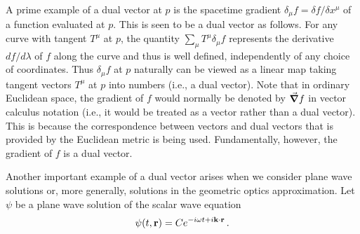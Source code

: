 A prime example of a dual vector at $p$ is the spacetime gradient $\delta_\mu f = \delta f / \delta x^\mu$ of a function evaluated at $p$. This is seen to be a dual vector as follows. For any curve with tangent $T^\mu$ at $p$, the quantity $\sum_\mu T^\mu \delta_\mu f$ represents the derivative $df / d \lambda$ of $f$ along the curve and thus is well defined, independently of any choice of coordinates. Thus $\delta_\mu f$ at $p$ naturally can be viewed as a linear map taking tangent vectors $T^\mu$ at $p$ into numbers (i.e., a dual vector). Note that in ordinary Euclidean space, the gradient of $f$ would normally be denoted by $\grad f$ in vector calculus notation (i.e., it would be treated as a vector rather than a dual vector). This is because the correspondence between vectors and dual vectors that is provided by the Euclidean metric is being used. Fundamentally, however, the gradient of $f$ is a dual vector.

Another important example of a dual vector arises when we consider plane wave solutions or, more generally, solutions in the geometric optics approximation. Let $\psi$ be a plane wave solution of the scalar wave equation
\begin{equation}\label{eq:Wald_08.20}
\psi(t, \vb{r}) = C \vexp{-i \omega t + i \vb{k}\cdot\vb{r} }\,.
\end{equation}

